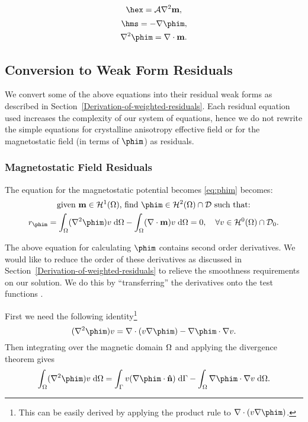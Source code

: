 \begin{equation}
  \label{eq:hex}
  \hex = \exchc \nabla^2 \mv,
\end{equation}
\begin{align}
  \hms = - \nabla \phim, \label{eq:hms} \\
  \nabla^2 \phim = \nabla \cdot \mv. \label{eq:phim}
\end{align}





\subsection{Conversion to Weak Form Residuals}

We convert some of the above equations into their residual weak forms as described in Section~\ref{Derivation-of-weighted-residuals}. Each residual equation used increases the complexity of our system of equations, hence we do not rewrite the simple equations for crystalline anisotropy effective field or for the magnetostatic field (in terms of $\phim$) as residuals.


\subsubsection{Magnetostatic Field Residuals}
\label{sec:magn-field-resid}

The equation for the magnetostatic potential becomes \eqref{eq:phim} becomes:
\begin{gather}
  \text{given $\mv \in \sob^1(\magd)$, find $\phim \in \sob^2(\magd) \cap \Dfs$ such that:} \notag \\
  r_{\phim} = \int_\magd (\nabla^2 \phim) v  \d \magd
  - \int_\magd (\nabla \cdot \mv) v \d \magd = 0,
  \quad \forall v \in \sob^0(\magd) \cap \Dfs_0. \label{eqn:phires1}
\end{gather}

The above equation for calculating $\phim$ contains second order derivatives.
We would like to reduce the order of these derivatives as discussed in Section~\ref{Derivation-of-weighted-residuals} to relieve the smoothness requirements on our solution.
We do this by ``transferring'' the derivatives onto the test functions \cite{HowardElmanDavidSilvester2006}.

First we need the following identity\footnote{This can be easily derived by applying the product rule to $\nabla \cdot (v \nabla \phim)$.}
\begin{equation}
  (\nabla^2 \phim) v =
  \nabla \cdot (v \nabla \phim)
  - \nabla \phim \cdot \nabla v.
  \label{eq:20}
\end{equation}
Then integrating over the magnetic domain $\Omega$ and applying the divergence theorem gives
\begin{equation}
  \int_\magd (\nabla^2 \phim) v \d \magd =
  \int_{\boundd} v (\nabla \phim \cdot \nv) \d \boundd
  - \int_\magd \nabla \phim \cdot \nabla v \d \magd.
  \label{eqn:identitygauss}
\end{equation}

